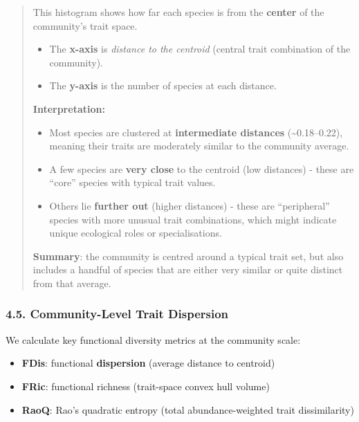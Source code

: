 \documentclass[
]{article}
\providecommand{\tightlist}{%
  \setlength{\itemsep}{0pt}\setlength{\parskip}{0pt}}
\begin{document}
\begin{quote}
This histogram shows how far each species is from the \textbf{center} of
the community's trait space.

\begin{itemize}
\tightlist
\item
  The \textbf{x-axis} is \emph{distance to the centroid} (central trait
  combination of the community).
\item
  The \textbf{y-axis} is the number of species at each distance.
\end{itemize}

\textbf{Interpretation:}

\begin{itemize}
\tightlist
\item
  Most species are clustered at \textbf{intermediate distances}
  (\textasciitilde0.18--0.22), meaning their traits are moderately
  similar to the community average.
\item
  A few species are \textbf{very close} to the centroid (low distances)
  - these are ``core'' species with typical trait values.\\
\item
  Others lie \textbf{further out} (higher distances) - these are
  ``peripheral'' species with more unusual trait combinations, which
  might indicate unique ecological roles or specialisations.
\end{itemize}

\textbf{Summary}: the community is centred around a typical trait set,
but also includes a handful of species that are either very similar or
quite distinct from that average.
\end{quote}

\hypertarget{community-level-trait-dispersion}{%
\subsubsection{4.5. Community-Level Trait
Dispersion}\label{community-level-trait-dispersion}}

We calculate key functional diversity metrics at the community scale:

\begin{itemize}
\tightlist
\item
  \textbf{FDis}: functional \textbf{dispersion} (average distance to
  centroid)
\item
  \textbf{FRic}: functional richness (trait-space convex hull volume)
\item
  \textbf{RaoQ}: Rao's quadratic entropy (total abundance-weighted trait
  dissimilarity)
\end{itemize}
\end{document}
